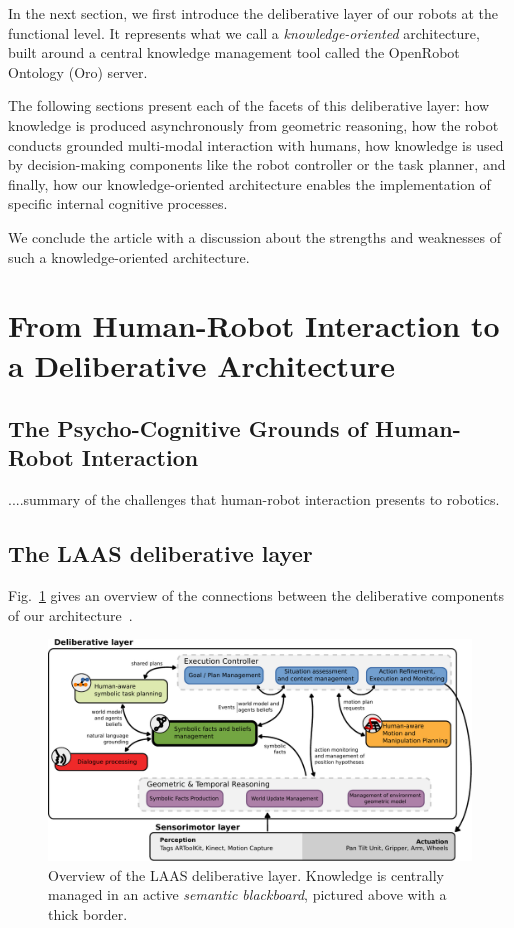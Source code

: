 \documentclass[preprint,12pt]{elsarticle}
\begin{document}
In the next section, we first introduce the deliberative layer of our robots at
the functional level. It represents what we call a \emph{knowledge-oriented}
architecture, built around a central knowledge management tool called the
OpenRobot Ontology ({\sc Oro}) server.

The following sections present each of the facets of this deliberative layer:
how knowledge is produced asynchronously from geometric reasoning, how the
robot conducts grounded multi-modal interaction with humans, how knowledge is
used by decision-making components like the robot controller or the task
planner, and finally, how our knowledge-oriented architecture enables the
implementation of specific internal cognitive processes.

We conclude the article with a discussion about the strengths and weaknesses of
such a knowledge-oriented architecture.


\section{From Human-Robot Interaction to a Deliberative Architecture}

\subsection{The Psycho-Cognitive Grounds of Human-Robot Interaction}

....summary of the challenges that human-robot interaction presents to robotics.

\subsection{The LAAS deliberative layer}

Fig.~\ref{fig|archi} gives an overview of the connections between the
deliberative components of our architecture~\cite{Alami2011}.

\begin{figure}
        \centering
        \includegraphics[width=1.0\columnwidth]{archi}
        \caption{Overview of the LAAS deliberative layer. Knowledge is
        centrally managed in an active \emph{semantic blackboard}, pictured
        above with a thick border.}
        \label{fig|archi}
\end{figure}
\end{document}
